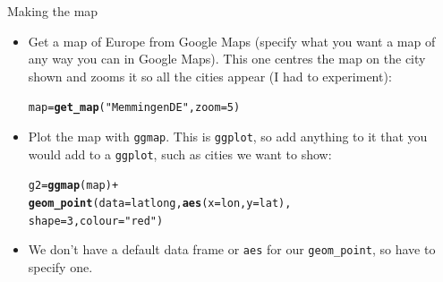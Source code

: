 \documentclass[unknownkeysallowed]{beamer}\usepackage[]{graphicx}\usepackage[]{color}
\makeatletter
\newcommand{\hlnum}[1]{\textcolor[rgb]{0.686,0.059,0.569}{#1}}%
\newcommand{\hlstr}[1]{\textcolor[rgb]{0.192,0.494,0.8}{#1}}%
\newcommand{\hlopt}[1]{\textcolor[rgb]{0,0,0}{#1}}%
\newcommand{\hlstd}[1]{\textcolor[rgb]{0.345,0.345,0.345}{#1}}%
\newcommand{\hlkwb}[1]{\textcolor[rgb]{0.69,0.353,0.396}{#1}}%
\newcommand{\hlkwc}[1]{\textcolor[rgb]{0.333,0.667,0.333}{#1}}%
\newcommand{\hlkwd}[1]{\textcolor[rgb]{0.737,0.353,0.396}{\textbf{#1}}}%
\newenvironment{kframe}{%
 \def\at@end@of@kframe{}%
 \ifinner\ifhmode%
  \def\at@end@of@kframe{\end{minipage}}%
  \begin{minipage}{\columnwidth}%
 \fi\fi%
 \def\FrameCommand##1{\hskip\@totalleftmargin \hskip-\fboxsep
 \colorbox{shadecolor}{##1}\hskip-\fboxsep
     \hskip-\linewidth \hskip-\@totalleftmargin \hskip\columnwidth}%
 \MakeFramed {\advance\hsize-\width
   \@totalleftmargin\z@ \linewidth\hsize
   \@setminipage}}%
 {\par\unskip\endMakeFramed%
 \at@end@of@kframe}
\newenvironment{knitrout}{}{} %
\makeatother
\begin{document}
\begin{frame}[fragile]{Making the map}
  
  \begin{itemize}
  \item Get a map of Europe from Google Maps (specify what you want a
    map of any way you can in Google Maps). This one centres the map
    on the city shown and zooms it so all the cities appear (I had to
    experiment):
\begin{knitrout}
\color{fgcolor}\begin{kframe}
\begin{alltt}
\hlstd{map}\hlkwb{=}\hlkwd{get_map}\hlstd{(}\hlstr{"Memmingen DE"}\hlstd{,}\hlkwc{zoom}\hlstd{=}\hlnum{5}\hlstd{)}
\end{alltt}
\end{kframe}
\end{knitrout}


\item Plot the map with \texttt{ggmap}. This is \texttt{ggplot},
  so add anything to it that you would
  add to a \texttt{ggplot}, such as cities we want to show:
  
\begin{knitrout}
\color{fgcolor}\begin{kframe}
\begin{alltt}
\hlstd{g2}\hlkwb{=}\hlkwd{ggmap}\hlstd{(map)}\hlopt{+}
  \hlkwd{geom_point}\hlstd{(}\hlkwc{data}\hlstd{=latlong,}\hlkwd{aes}\hlstd{(}\hlkwc{x}\hlstd{=lon,}\hlkwc{y}\hlstd{=lat),}
  \hlkwc{shape}\hlstd{=}\hlnum{3}\hlstd{,}\hlkwc{colour}\hlstd{=}\hlstr{"red"}\hlstd{)}
\end{alltt}
\end{kframe}
\end{knitrout}

\item We don't have a default data frame or \texttt{aes} for our
  \texttt{geom\_point}, so have to specify one.
  \end{itemize}
  
\end{frame}
\end{document}

